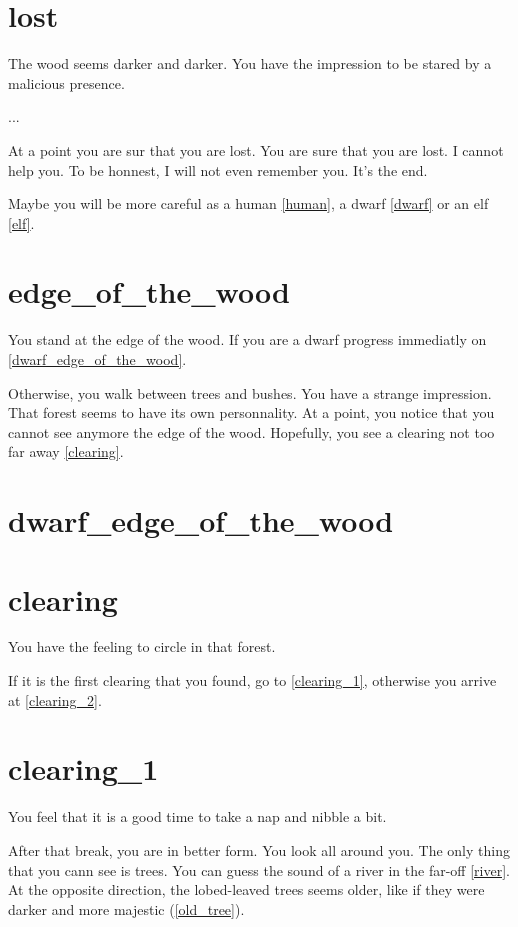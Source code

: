 \section{lost}

The wood seems darker and darker. You have the impression to be stared by a
malicious presence. 

...

At a point you are sur that you are lost. You are sure that you are lost. I
cannot help you. To be honnest, I will not even remember you. It's the end.

Maybe you will be more careful as a human \ref{human}, a dwarf \ref{dwarf} or an
elf \ref{elf}.

\section{edge_of_the_wood}

You stand at the edge of the wood. If you are a dwarf progress immediatly on
\ref{dwarf_edge_of_the_wood}.

Otherwise, you walk between trees and bushes. You have a strange impression.
That forest seems to have its own personnality. At a point, you notice that you
cannot see anymore the edge of the wood. Hopefully, you see a clearing not too
far away \ref{clearing}.

\section{dwarf_edge_of_the_wood}

\section{clearing}

You have the feeling to circle in that forest.

If it is the first clearing that you found, go to \ref{clearing_1}, otherwise
you arrive at \ref{clearing_2}.

\section{clearing_1}

You feel that it is a good time to take a nap and nibble a bit.

After that break, you are in better form. You look all around you. The only
thing that you cann see is trees. You can guess the sound of a river in the
far-off \ref{river}. At the opposite direction, the lobed-leaved trees seems
older, like if they were darker and more majestic (\ref{old_tree}).

